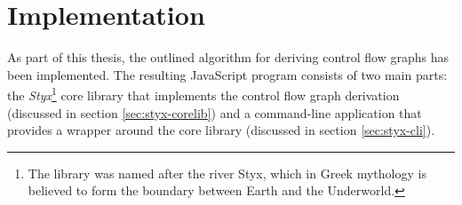 \section{Implementation}
\label{sec:implementation}

As part of this thesis, the outlined algorithm for deriving control flow graphs has been implemented. The resulting JavaScript program consists of two main parts: the \textit{Styx}\footnote{The library was named after the river Styx, which in Greek mythology is believed to form the boundary between Earth and the Underworld.} core library that implements the control flow graph derivation (discussed in section \ref{sec:styx-corelib}) and a command-line application that provides a wrapper around the core library (discussed in section \ref{sec:styx-cli}). 




